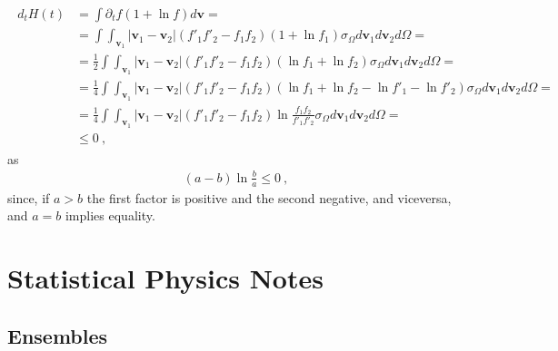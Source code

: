 \documentclass[letterpaper,10pt,english]{jupyterBook}
\begin{document}
\sphinxAtStartPar
{} 
\begin{equation*}
\begin{split}\begin{aligned}
  d_t H(t) 
  & = \int \partial_t f \left( 1 + \ln f \right) d \mathbf{v} = \\
  & = \int \int_{\mathbf{v}_1} |\mathbf{v}_1 - \mathbf{v}_2| (f'_1 f'_2 - f_1 f_2) \left( 1 + \ln f_1 \right) \sigma_{\Omega} d \mathbf{v}_1 d \mathbf{v}_2 d\Omega = \\
  & = \frac{1}{2} \int \int_{\mathbf{v}_1} |\mathbf{v}_1 - \mathbf{v}_2| (f'_1 f'_2 - f_1 f_2) \left( \ln f_1 + \ln f_2 \right) \sigma_{\Omega} d \mathbf{v}_1 d \mathbf{v}_2 d\Omega = \\
  & = \frac{1}{4} \int \int_{\mathbf{v}_1} |\mathbf{v}_1 - \mathbf{v}_2| (f'_1 f'_2 - f_1 f_2) \left( \ln f_1 + \ln f_2 - \ln f'_1 - \ln f'_2 \right) \sigma_{\Omega} d \mathbf{v}_1 d \mathbf{v}_2 d\Omega = \\
  & = \frac{1}{4} \int \int_{\mathbf{v}_1} |\mathbf{v}_1 - \mathbf{v}_2| (f'_1 f'_2 - f_1 f_2) \ln \frac{ f_1 f_2 }{f'_1 f'_2} \sigma_{\Omega} d \mathbf{v}_1 d \mathbf{v}_2 d\Omega = \\
  & \le 0 \ ,
\end{aligned}\end{split}
\end{equation*}
\sphinxAtStartPar
as
\begin{equation*}
\begin{split}(a-b) \ln \frac{b}{a} \le 0 \ ,\end{split}
\end{equation*}
\sphinxAtStartPar
since, if \(a > b\) the first factor is positive and the second negative, and viceversa, and \(a = b\) implies equality.

\sphinxstepscope


\chapter{Statistical Physics \sphinxhyphen{} Notes}
\label{\detokenize{ch/statistical-mechanics/notes:statistical-physics-notes}}\label{\detokenize{ch/statistical-mechanics/notes:statistical-mechanics-notes}}\label{\detokenize{ch/statistical-mechanics/notes::doc}}

\section{Ensembles}
\label{\detokenize{ch/statistical-mechanics/notes:ensembles}}\label{\detokenize{ch/statistical-mechanics/notes:statistical-mechanics-notes-ensembles}}
\end{document}
